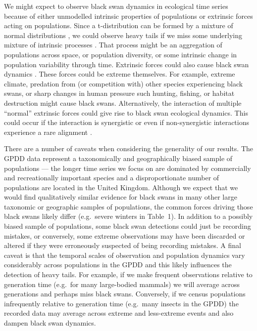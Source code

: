 We might expect to observe black swan dynamics in ecological time series because of either unmodelled intrinsic properties of populations or extrinsic forces acting on populations. Since a t-distribution can be formed by a mixture of normal distributions \citep{gelman2014}, we could observe heavy tails if we miss some underlying mixture of intrinsic processes \citep{allen2001}. That process might be an aggregation of populations across space, or population diversity, or some intrinsic change in population variability through time. Extrinsic forces could also cause black swan dynamics \citep[e.g.][]{nunez2012}. These forces could be extreme themselves. For example, extreme climate, predation from (or competition with) other species experiencing black swans, or sharp changes in human pressure such hunting, fishing, or habitat destruction might cause black swans. Alternatively, the interaction of multiple ``normal'' extrinsic forces could give rise to black swan ecological dynamics. This could occur if the interaction is synergistic \citep[e.g.][]{kirby2009} or even if non-synergistic interactions experience a rare alignment \citep{denny2009}.

There are a number of caveats when considering the generality of our results. The GPDD data represent a taxonomically and geographically biased sample of populations --- the longer time series we focus on are dominated by commercially and recreationally important species and a disproportionate number of populations are located in the United Kingdom. Although we expect that we would find qualitatively similar evidence for black swans in many other large taxonomic or geographic samples of populations, the common forces driving those black swans likely differ (e.g.~severe winters in Table~1). In addition to a possibly biased sample of populations, some black swan detections could just be recording mistakes, or conversely, some extreme observations may have been discarded or altered if they were erroneously suspected of being recording mistakes. A final caveat is that the temporal scales of observation and population dynamics vary considerably across populations in the GPDD and this likely influences the detection of heavy tails. For example, if we make frequent observations relative to generation time (e.g.~for many large-bodied mammals) we will average across generations and perhaps miss black swans. Conversely, if we census populations infrequently relative to generation time (e.g.~many insects in the GPDD) the recorded data may average across extreme and less-extreme events and also dampen black swan dynamics.

